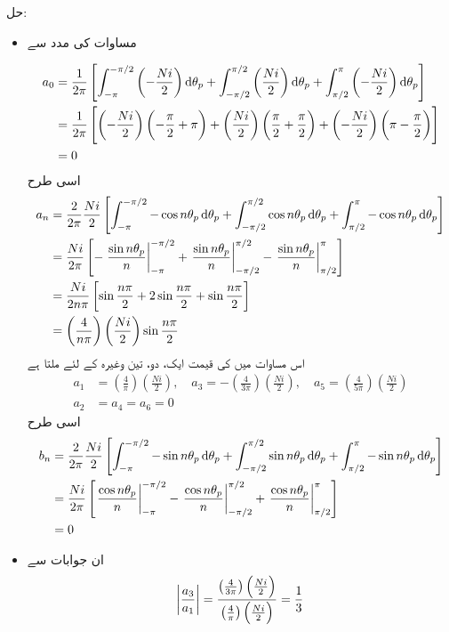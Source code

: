 حل:
\begin{itemize}
\item
مساوات   کی مدد سے

\begin{align*}
a_0&=\frac{1}{2\pi} \left[\int_{-\pi}^{-\pi/2} \left(-\frac{Ni}{2} \right) \dif \theta_p+\int_{-\pi/2}^{\pi/2} \left (\frac{Ni}{2}\right) \dif \theta_p +\int_{\pi/2}^{\pi} \left(-\frac{Ni}{2}\right) \dif \theta_p  \right]\\
&=\frac{1}{2\pi} \left[\left(-\frac{Ni}{2} \right)\left(-\frac{\pi}{2}+\pi \right) +\left(\frac{Ni}{2} \right)\left(\frac{\pi}{2}+\frac{\pi}{2} \right)+\left(-\frac{Ni}{2} \right)\left(\pi-\frac{\pi}{2} \right)\right]\\
&=0
\end{align*}
اسی طرح
\begin{align*}
a_n&=\frac{2}{2\pi} \frac{Ni}{2} \left[\int_{-\pi}^{-\pi/2} -\cos n \theta_p \dif \theta_p +\int_{-\pi/2}^{\pi/2} \cos n \theta_p \dif \theta_p+\int_{\pi/2}^{\pi} -\cos n \theta_p \dif \theta_p\right]\\
&=\frac{Ni}{2\pi} \left[-\left. \frac{\sin n \theta_p}{n}\right|_{-\pi}^{-\pi/2} +\left. \frac{\sin n \theta_p}{n}\right|_{-\pi/2}^{\pi/2} -\left. \frac{\sin n \theta_p}{n}\right|_{\pi/2}^{\pi} \right]\\
&=\frac{Ni}{2n\pi} \left[\sin \frac{n\pi}{2}+2\sin \frac{n\pi}{2}+\sin \frac{n\pi}{2} \right]\\
&=\left(\frac{4}{n\pi}\right) \left( \frac{Ni}{2}\right) \sin \frac{n\pi}{2}
\end{align*}
اس مساوات میں  کی قیمت ایک، دو، تین وغیرہ کے لئے ملتا ہے
\begin{align*}
a_1&=\left(\frac{4}{\pi}\right) \left( \frac{Ni}{2}\right), \quad a_3=-\left(\frac{4}{3\pi}\right) \left( \frac{Ni}{2}\right), \quad a_5=\left(\frac{4}{5\pi}\right) \left( \frac{Ni}{2}\right)\\
a_2&=a_4=a_6=0
\end{align*}
اسی طرح
\begin{align*}
b_n&=\frac{2}{2\pi} \frac{Ni}{2} \left[\int_{-\pi}^{-\pi/2} -\sin n \theta_p \dif \theta_p +\int_{-\pi/2}^{\pi/2} \sin n \theta_p \dif \theta_p+\int_{\pi/2}^{\pi} -\sin n \theta_p \dif \theta_p\right]\\
&=\frac{Ni}{2\pi} \left[\left. \frac{\cos n \theta_p}{n}\right|_{-\pi}^{-\pi/2} -\left. \frac{\cos n \theta_p}{n}\right|_{-\pi/2}^{\pi/2} +\left. \frac{\cos n \theta_p}{n}\right|_{\pi/2}^{\pi} \right]\\
&=0
\end{align*}
\item
ان جوابات سے
\begin{align*}
\abs{\frac{a_3}{a_1}} =\frac{\left(\frac{4}{3\pi}\right) \left( \frac{Ni}{2}\right)}{\left(\frac{4}{\pi}\right) \left( \frac{Ni}{2}\right)}=\frac{1}{3}
\end{align*}
\end{itemize}
